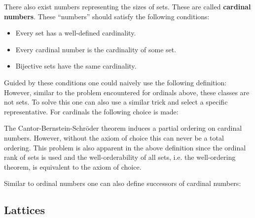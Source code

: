     There also exist numbers representing the sizes of sets. These are called \textbf{cardinal numbers}. These ``numbers'' should satisfy the following conditions:
    \begin{itemize}
        \item Every set has a well-defined cardinality.
        \item Every cardinal number is the cardinality of some set.
        \item Bijective sets have the same cardinality.
    \end{itemize}
    Guided by these conditions one could naively use the following definition:
    However, similar to the problem encountered for ordinals above, these classes are not sets. To solve this one can also use a similar trick and select a specific representative. For cardinals the following choice is made:

    \begin{remark}[Ordering]
        The Cantor-Bernstein-Schr\"oder theorem induces a partial ordering on cardinal numbers. However, without the axiom of choice this can never be a total ordering. This problem is also apparent in the above definition since the ordinal rank of sets is used and the well-orderability of all sets, i.e. the well-ordering theorem, is equivalent to the axiom of choice.
    \end{remark}

    Similar to ordinal numbers one can also define successors of cardinal numbers:

\subsection{Lattices}

